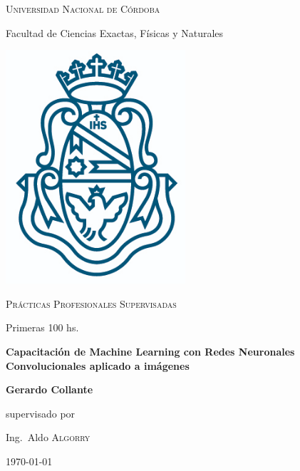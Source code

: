 \documentclass[14.5pt,a4paper]{article}
\begin{document}
\begin{titlepage}
	
	{\scshape\LARGE Universidad Nacional de Córdoba \par}
	{\Large Facultad de Ciencias Exactas, Físicas y Naturales \par}
	\vspace{0.5cm}
	\centering
	\includegraphics[width=0.5\textwidth]{unc.png}
	\par\vspace{0.5cm}
	\vspace{0.5cm}
	{\scshape\Large Prácticas Profesionales Supervisadas\par}
	{\large Primeras 100 hs.\par}
	\vspace{1.5cm}
	{\large\bfseries Capacitación de Machine Learning con Redes Neuronales Convolucionales aplicado a imágenes \par}
	\vspace{1.5cm}
	{\Large\bfseries Gerardo Collante\par}
	\vfill
	supervisado por\par
	Ing.~Aldo \textsc{Algorry}

	\vfill

	{\large \today\par}
\end{titlepage}

\end{document}
